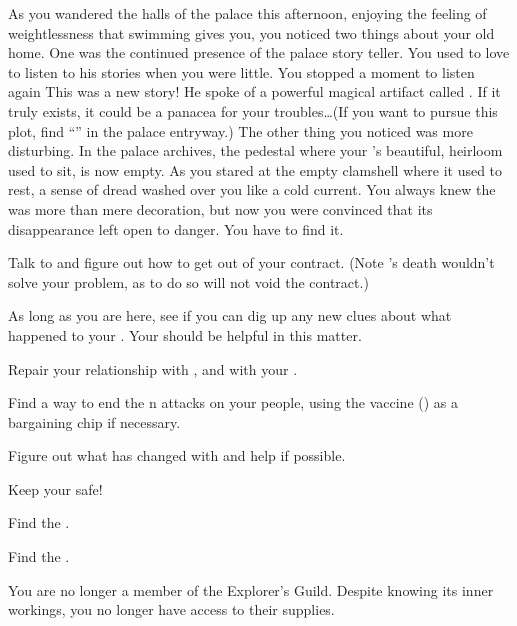 \documentclass[char]{NeptuneBall}
\begin{document}
As you wandered the halls of the palace this afternoon, enjoying the feeling of weightlessness that swimming gives you, you noticed two things about your old home. One was the continued presence of the palace story teller. You used to love to listen to his stories when you were little. You stopped a moment to listen again This was a new story! He spoke of a powerful magical artifact called \iWishingStone{\MYname}. If it truly exists, it could be a panacea for your troubles\ldots (If you want to pursue this plot, find ``\sOldMan{}'' in the palace entryway.) The other thing you noticed was more disturbing. In the palace archives, the pedestal where your \cAthena{\parent}'s beautiful, heirloom \iMusicBox{} used to sit, is now empty. As you stared at the empty clamshell where it used to rest, a sense of dread washed over you like a cold current. You always knew the \iMusicBox{} was more than mere decoration, but now you were convinced that its disappearance left \pAtlantis{} open to danger. You have to find it.


\begin{itemz}[Goals]
  \item Talk to \cWitch{} and figure out how to get out of your contract. (Note \cWitch{}'s death wouldn't solve your problem, as to do so will not void the contract.)
  \item As long as you are here, see if you can dig up any new clues about what happened to your \cAthena{\parent}. Your \cPrincess{\sibling} should be helpful in this matter.
  \item Repair your relationship with \cKing{\King} \cKing{}, and with your \cPrincess{\sibling} \cPrincess{}.
	\item Find a way to end the \pPacifica{}n attacks on your people, using the vaccine (\iVaccine{}) as a bargaining chip if necessary.
  \item Figure out what has changed with \cPriest{} and help \cPriest{\them} if possible.
  \item Keep your \cWillow{\offspring} safe!
  \item Find the \iWishingStone{}.
  \item Find the \iMusicBox{}.
\end{itemz}

\begin{itemz}[Notes]
  \item You are no longer a member of the Explorer's Guild. Despite knowing its inner workings, you no longer have access to their supplies.
\end{itemz}
\end{document}
